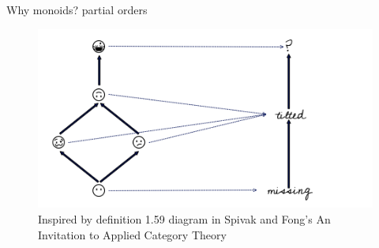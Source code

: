 \begin{frame}{Why monoids? partial orders}
\begin{figure}
\begin{overprint}
            \includegraphics[width=1\linewidth]{figures/math/monoid_maps.png}
        \end{overprint}
    \caption{Inspired by definition 1.59 diagram in Spivak and Fong's An Invitation to Applied Category Theory \cite{fongInvitationAppliedCategory2019}}
    \end{figure}
\end{frame}

